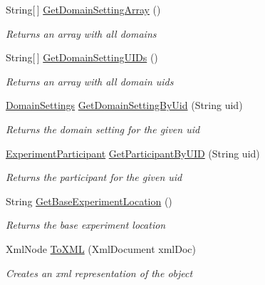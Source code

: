 \begin{DoxyCompactItemize}
String\mbox{[}$\,$\mbox{]} \hyperlink{class_web_analyzer_1_1_models_1_1_base_1_1_experiment_model_abb3bdca255c65bedcd3e48c03b618dae}{Get\+Domain\+Setting\+Array} ()
\begin{DoxyCompactList}\small\item\em Returns an array with all domains \end{DoxyCompactList}\item 
String\mbox{[}$\,$\mbox{]} \hyperlink{class_web_analyzer_1_1_models_1_1_base_1_1_experiment_model_aadb028e75684f16bd92456a883bb1d6a}{Get\+Domain\+Setting\+U\+I\+Ds} ()
\begin{DoxyCompactList}\small\item\em Returns an array with all domain uids \end{DoxyCompactList}\item 
\hyperlink{class_web_analyzer_1_1_models_1_1_settings_model_1_1_domain_settings}{Domain\+Settings} \hyperlink{class_web_analyzer_1_1_models_1_1_base_1_1_experiment_model_a8054747fc8c5ff6a0cc2a7d0fed7a11e}{Get\+Domain\+Setting\+By\+Uid} (String uid)
\begin{DoxyCompactList}\small\item\em Returns the domain setting for the given uid \end{DoxyCompactList}\item 
\hyperlink{class_web_analyzer_1_1_models_1_1_base_1_1_experiment_participant}{Experiment\+Participant} \hyperlink{class_web_analyzer_1_1_models_1_1_base_1_1_experiment_model_a1598095ae1e7e07f44c91db79d751666}{Get\+Participant\+By\+U\+I\+D} (String uid)
\begin{DoxyCompactList}\small\item\em Returns the participant for the given uid \end{DoxyCompactList}\item 
String \hyperlink{class_web_analyzer_1_1_models_1_1_base_1_1_experiment_model_a113bb9a3b5a24817086eca3dd1320a5c}{Get\+Base\+Experiment\+Location} ()
\begin{DoxyCompactList}\small\item\em Returns the base experiment location \end{DoxyCompactList}\item 
Xml\+Node \hyperlink{class_web_analyzer_1_1_models_1_1_base_1_1_experiment_model_a28b8ebb68293b7ab351bcd5734c7960c}{To\+X\+M\+L} (Xml\+Document xml\+Doc)
\begin{DoxyCompactList}\small\item\em Creates an xml representation of the object \end{DoxyCompactList}\end{DoxyCompactItemize}
